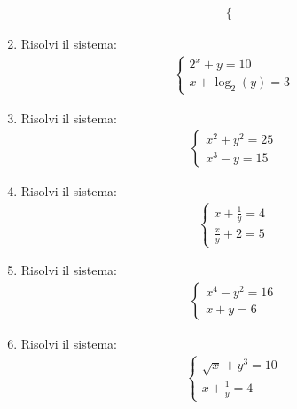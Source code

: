 \documentclass[letterpaper,10pt,italian]{jupyterBook}
\begin{document}
\begin{enumerate}
\begin{equation*}
\begin{split}
\begin{cases}
    \end{cases}
    \end{split}
\end{equation*}
\item {} 
\sphinxAtStartPar
Risolvi il sistema:
\begin{equation*}
\begin{split}
    \begin{cases}
    2^x + y = 10 \\
    x + \log_2(y) = 3
    \end{cases}
    \end{split}
\end{equation*}
\item {} 
\sphinxAtStartPar
Risolvi il sistema:
\begin{equation*}
\begin{split}
    \begin{cases}
    x^2 + y^2 = 25 \\
    x^3 - y = 15
    \end{cases}
    \end{split}
\end{equation*}
\item {} 
\sphinxAtStartPar
Risolvi il sistema:
\begin{equation*}
\begin{split}
    \begin{cases}
    x + \frac{1}{y} = 4 \\
    \frac{x}{y} + 2 = 5
    \end{cases}
    \end{split}
\end{equation*}
\item {} 
\sphinxAtStartPar
Risolvi il sistema:
\begin{equation*}
\begin{split}
    \begin{cases}
    x^4 - y^2 = 16 \\
    x + y = 6
    \end{cases}
    \end{split}
\end{equation*}
\item {} 
\sphinxAtStartPar
Risolvi il sistema:
\begin{equation*}
\begin{split}
    \begin{cases}
    \sqrt{x} + y^3 = 10 \\
    x + \frac{1}{y} = 4
    \end{cases}

\end{split}
\end{equation*}
\end{enumerate}
\end{document}

